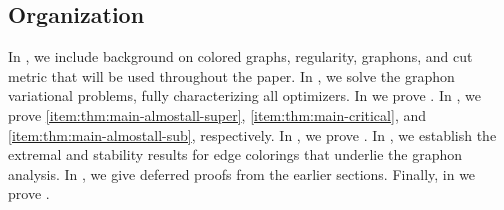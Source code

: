 \subsection{Organization}
In , we include background on colored graphs, regularity, graphons, and cut metric that will be used throughout the paper. In , we solve the graphon variational problems, fully characterizing all optimizers. In  we prove . In , we prove  \ref{item:thm:main-almostall-super}, \ref{item:thm:main-critical}, and \ref{item:thm:main-almostall-sub}, respectively. In , we prove . In , we establish the extremal and stability results for edge colorings that underlie the graphon analysis. In , we give deferred proofs from the earlier sections. Finally, in  we prove .
